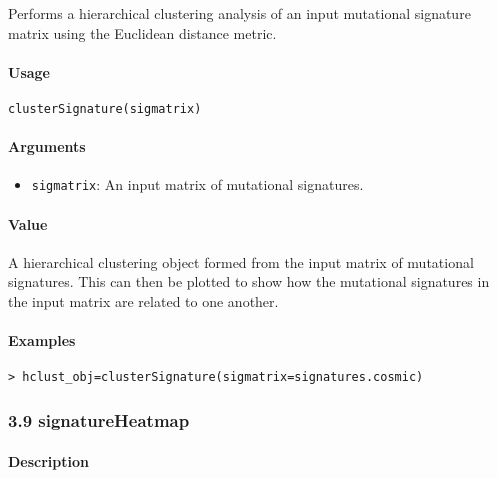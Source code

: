 \documentclass[]{article}
\providecommand{\tightlist}{%
  \setlength{\itemsep}{0pt}\setlength{\parskip}{0pt}}
\let\oldparagraph\paragraph
\renewcommand{\paragraph}[1]{\oldparagraph{#1}\mbox{}}
\begin{document}
Performs a hierarchical clustering analysis of an input mutational
signature matrix using the Euclidean distance metric.

\paragraph{\texorpdfstring{\textbf{Usage}}{Usage}}\label{usage-7}

\texttt{clusterSignature(sigmatrix)}

\paragraph{\texorpdfstring{\textbf{Arguments
}}{Arguments }}\label{arguments-6}

\begin{itemize}
\tightlist
\item
  \texttt{sigmatrix}: An input matrix of mutational signatures.
\end{itemize}

\paragraph{\texorpdfstring{\textbf{Value}}{Value}}\label{value-5}

A hierarchical clustering object formed from the input matrix of
mutational signatures. This can then be plotted to show how the
mutational signatures in the input matrix are related to one another.

\paragraph{\texorpdfstring{\textbf{Examples}}{Examples}}\label{examples-7}

\begin{verbatim}
> hclust_obj=clusterSignature(sigmatrix=signatures.cosmic) 
\end{verbatim}

\subsubsection{3.9 signatureHeatmap}\label{signatureheatmap}

\paragraph{\texorpdfstring{\textbf{Description}}{Description}}\label{description-7}
\end{document}
